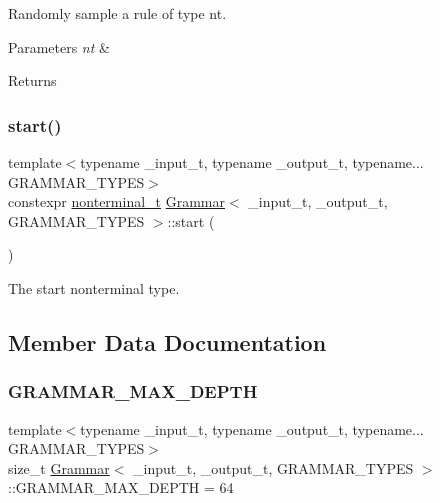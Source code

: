 Randomly sample a rule of type nt. 
\begin{DoxyParams}{Parameters}
{\em nt} & \\
\hline
\end{DoxyParams}
\begin{DoxyReturn}{Returns}

\end{DoxyReturn}
\mbox{\label{class_grammar_a7126c9e6abbedc4c43047c0ddd2cce5a}} 
\subsubsection{\texorpdfstring{start()}{start()}}
{\footnotesize\ttfamily template$<$typename \+\_\+input\+\_\+t, typename \+\_\+output\+\_\+t, typename... G\+R\+A\+M\+M\+A\+R\+\_\+\+T\+Y\+P\+ES$>$ \\
constexpr \hyperlink{_nonterminal_8h_a1c5bfe9b903f69c83bbde5da7035fef3}{nonterminal\+\_\+t} \hyperlink{class_grammar}{Grammar}$<$ \+\_\+input\+\_\+t, \+\_\+output\+\_\+t, G\+R\+A\+M\+M\+A\+R\+\_\+\+T\+Y\+P\+ES $>$\+::start (\begin{DoxyParamCaption}{ }\end{DoxyParamCaption})\hspace{0.3cm}{\ttfamily [inline]}}



The start nonterminal type. 



\subsection{Member Data Documentation}
\mbox{\label{class_grammar_a87c7974198d014c9fd324fbfd39b62e6}} 
\subsubsection{\texorpdfstring{G\+R\+A\+M\+M\+A\+R\+\_\+\+M\+A\+X\+\_\+\+D\+E\+P\+TH}{GRAMMAR\_MAX\_DEPTH}}
{\footnotesize\ttfamily template$<$typename \+\_\+input\+\_\+t, typename \+\_\+output\+\_\+t, typename... G\+R\+A\+M\+M\+A\+R\+\_\+\+T\+Y\+P\+ES$>$ \\
size\+\_\+t \hyperlink{class_grammar}{Grammar}$<$ \+\_\+input\+\_\+t, \+\_\+output\+\_\+t, G\+R\+A\+M\+M\+A\+R\+\_\+\+T\+Y\+P\+ES $>$\+::G\+R\+A\+M\+M\+A\+R\+\_\+\+M\+A\+X\+\_\+\+D\+E\+P\+TH = 64}

